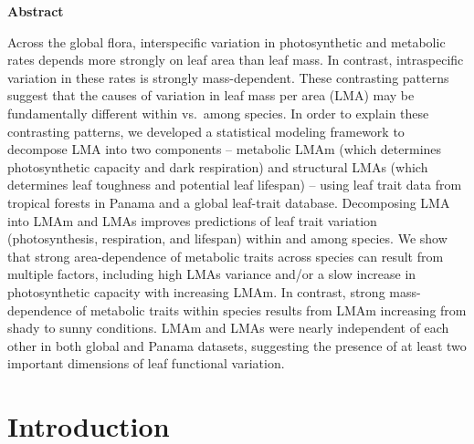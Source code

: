 \documentclass[
  12pt,
  letterpaper,
  DIV=11,
  numbers=noendperiod]{scrartcl}
\begin{document}
\textbf{Abstract}

Across the global flora, interspecific variation in photosynthetic and
metabolic rates depends more strongly on leaf area than leaf mass. In
contrast, intraspecific variation in these rates is strongly
mass-dependent. These contrasting patterns suggest that the causes of
variation in leaf mass per area (LMA) may be fundamentally different
within vs.~among species. In order to explain these contrasting
patterns, we developed a statistical modeling framework to decompose LMA
into two components -- metabolic LMAm (which determines photosynthetic
capacity and dark respiration) and structural LMAs (which determines
leaf toughness and potential leaf lifespan) -- using leaf trait data
from tropical forests in Panama and a global leaf-trait database.
Decomposing LMA into LMAm and LMAs improves predictions of leaf trait
variation (photosynthesis, respiration, and lifespan) within and among
species. We show that strong area-dependence of metabolic traits across
species can result from multiple factors, including high LMAs variance
and/or a slow increase in photosynthetic capacity with increasing LMAm.
In contrast, strong mass-dependence of metabolic traits within species
results from LMAm increasing from shady to sunny conditions. LMAm and
LMAs were nearly independent of each other in both global and Panama
datasets, suggesting the presence of at least two important dimensions
of leaf functional variation.

\section{Introduction}\label{introduction}
\end{document}
